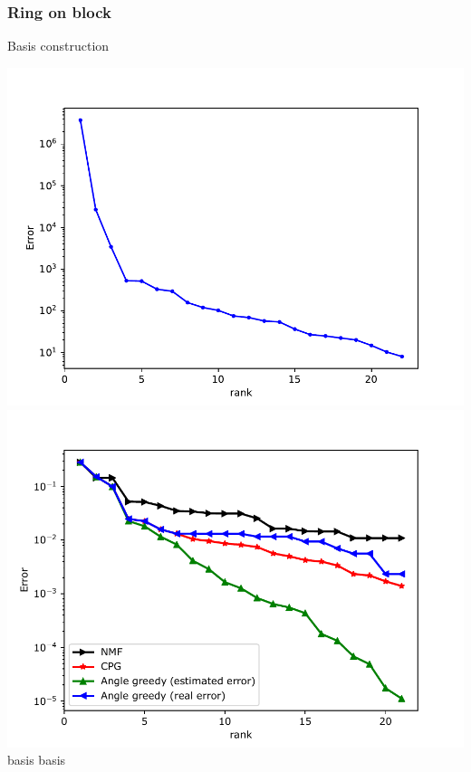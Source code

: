 \begin{frame}\frametitle{Ring on block}
	Basis construction
	\begin{center}
		\hspace{-.7cm}
		\includegraphics[width=.55\textwidth]{./images/contact/sgv_ring.pdf}
		\hspace{-.7cm}
		\includegraphics[width=.55\textwidth]{./images/contact/nmf_ring.pdf}
		\small{\hspace{1.8cm} basis
			\hspace{3.4cm} basis}
	\end{center}
\end{frame}



